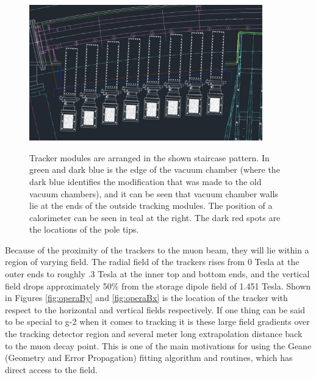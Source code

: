 \documentclass{article}
\begin{document}
\begin{figure}[]
\caption{Tracker modules are arranged in the shown staircase pattern. In green and dark blue is the edge of the vacuum chamber (where the dark blue identifies the modification that was made to the old vacuum chambers), and it can be seen that vacuum chamber walls lie at the ends of the outside tracking modules. The position of a calorimeter can be seen in teal at the right. The dark red spots are the locations of the pole tips.}
\centering
\includegraphics[width=0.9\textwidth]{trackerStation}
\label{fig:staircase}
\end{figure}


  Because of the proximity of the trackers to the muon beam, they will lie within a region of varying field. The radial field of the trackers rises from 0 Tesla at the outer ends to roughly .3 Tesla at the inner top and bottom ends, and the vertical field drops approximately 50\% from the storage dipole field of 1.451 Tesla. Shown in Figures \ref{fig:operaBy} and \ref{fig:operaBx} is the location of the tracker with respect to the horizontal and vertical fields respectively. If one thing can be said to be special to g-2 when it comes to tracking it is these large field gradients over the tracking detector region and several meter long extrapolation distance back to the muon decay point. This is one of the main motivations for using the Geane (Geometry and Error Propagation) fitting algorithm and routines, which has direct access to the field. 
\end{document}
